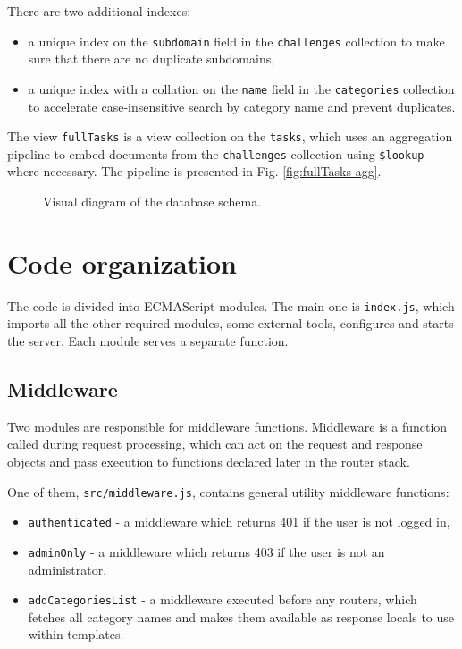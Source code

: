 There are two additional indexes:

\begin{itemize}
    \item a unique index on the \texttt{subdomain} field in the \texttt{challenges} collection to make sure that there are no duplicate subdomains,
    \item a unique index with a collation on the \texttt{name} field in the \texttt{categories} collection to accelerate case-insensitive search by category name and prevent duplicates.
\end{itemize}

The view \texttt{fullTasks} is a view collection on the \texttt{tasks}, which uses an aggregation pipeline to embed documents from the \texttt{challenges} collection using \texttt{\$lookup} where necessary. The pipeline is presented in Fig. \ref{fig:fullTasks-agg}.

\begin{figure}
    \centering
    
    \caption{Visual diagram of the database schema.}
    \label{fig:db-schema}
\end{figure}

\section{Code organization}

The code is divided into ECMAScript modules. The main one is \texttt{index.js}, which imports all the other required modules, some external tools, configures and starts the server. Each module serves a separate function.

\subsection{Middleware}

Two modules are responsible for middleware functions. Middleware is a function called during request processing, which can act on the request and response objects and pass execution to functions declared later in the router stack.

One of them, \texttt{src/middleware.js}, contains general utility middleware functions:

\begin{itemize}
    \item \texttt{authenticated} - a middleware which returns 401 if the user is not logged in,
    \item \texttt{adminOnly} - a middleware which returns 403 if the user is not an administrator,
    \item \texttt{addCategoriesList} - a middleware executed before any routers, which fetches all category names and makes them available as response locals to use within templates.
\end{itemize}

